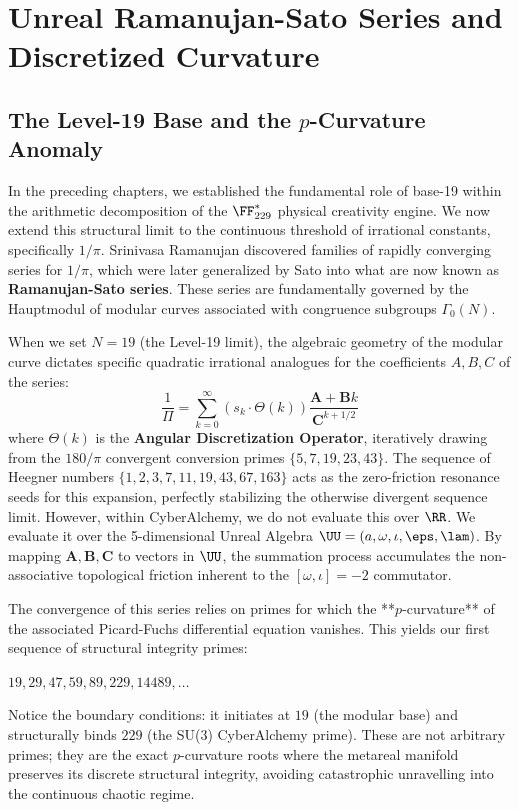 \section{Unreal Ramanujan-Sato Series and Discretized Curvature}

\subsection{The Level-19 Base and the $p$-Curvature Anomaly}
In the preceding chapters, we established the fundamental role of base-19 within the arithmetic decomposition of the $\FF_{229}^*$ physical creativity engine. We now extend this structural limit to the continuous threshold of irrational constants, specifically $1/\pi$. Srinivasa Ramanujan discovered families of rapidly converging series for $1/\pi$, which were later generalized by Sato into what are now known as \textbf{Ramanujan-Sato series}. These series are fundamentally governed by the Hauptmodul of modular curves associated with congruence subgroups $\Gamma_0(N)$.

When we set $N=19$ (the Level-19 limit), the algebraic geometry of the modular curve dictates specific quadratic irrational analogues for the coefficients $A, B, C$ of the series:
\begin{equation}
\frac{1}{\Pi} = \sum_{k=0}^{\infty} \left( s_k \cdot \Theta(k) \right) \frac{\mathbf{A} + \mathbf{B}k}{\mathbf{C}^{k+1/2}}
\end{equation}
where $\Theta(k)$ is the \textbf{Angular Discretization Operator}, iteratively drawing from the $180/\pi$ convergent conversion primes $\{5, 7, 19, 23, 43\}$. The sequence of Heegner numbers $\{1, 2, 3, 7, 11, 19, 43, 67, 163\}$ acts as the zero-friction resonance seeds for this expansion, perfectly stabilizing the otherwise divergent sequence limit.
However, within CyberAlchemy, we do not evaluate this over $\RR$. We evaluate it over the 5-dimensional Unreal Algebra $\UU = (a, \omega, \iota, \eps, \lam)$. By mapping $\mathbf{A}, \mathbf{B}, \mathbf{C}$ to vectors in $\UU$, the summation process accumulates the non-associative topological friction inherent to the $[\omega, \iota] = -2$ commutator. 

The convergence of this series relies on primes for which the **$p$-curvature** of the associated Picard-Fuchs differential equation vanishes. This yields our first sequence of structural integrity primes:
\begin{center}
$19, 29, 47, 59, 89, 229, 14489, \dots$
\end{center}
Notice the boundary conditions: it initiates at $19$ (the modular base) and structurally binds $229$ (the SU(3) CyberAlchemy prime). These are not arbitrary primes; they are the exact $p$-curvature roots where the metareal manifold preserves its discrete structural integrity, avoiding catastrophic unravelling into the continuous chaotic regime.

